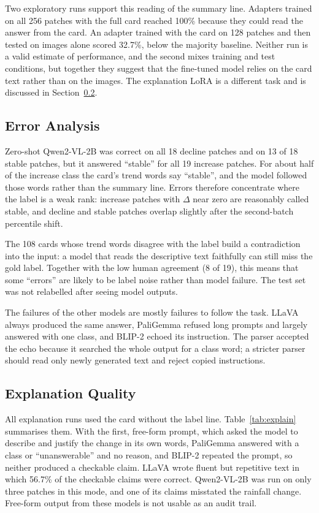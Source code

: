 Two exploratory runs support this reading of the summary line. Adapters
trained on all 256 patches with the full card reached 100\% because
they could read the answer from the card. An adapter trained with the
card on 128 patches and then tested on images alone scored 32.7\%,
below the majority baseline. Neither run is a valid estimate of
performance, and the second mixes training and test conditions, but
together they suggest that the fine-tuned model relies on the card text
rather than on the images. The explanation LoRA is a
different task and is discussed in Section~\ref{sec:expl}.

\subsection{Error Analysis}

Zero-shot Qwen2-VL-2B was correct on all 18 decline patches and on 13 of
18 stable patches, but it answered ``stable'' for all 19 increase
patches. For about half of the increase class the card's trend words
say ``stable'', and the model followed those words rather than the
summary line. Errors therefore concentrate where the label is a weak
rank: increase patches with $\Delta$ near zero are reasonably called
stable, and decline and stable patches overlap slightly after the
second-batch percentile shift.

The 108 cards whose trend words disagree with the label build a
contradiction into the input: a model that reads the descriptive text
faithfully can still miss the gold label. Together with the low human
agreement (8 of 19), this means that some ``errors'' are likely to be
label noise rather than model failure. The test set was not relabelled
after seeing model outputs.

The failures of the other models are mostly failures to follow the task.
LLaVA always produced the same answer, PaliGemma refused long prompts
and largely answered with one class, and BLIP-2 echoed its instruction.
The parser accepted the echo because it searched the whole output for a
class word; a stricter parser should read only newly generated text and
reject copied instructions.

\subsection{Explanation Quality}
\label{sec:expl}

All explanation runs used the card without the label line.
Table~\ref{tab:explain} summarises them. With the first, free-form
prompt, which asked the model to describe and justify the change in its
own words, PaliGemma answered with a class or ``unanswerable'' and no
reason, and BLIP-2 repeated the prompt, so neither produced a checkable
claim. LLaVA wrote fluent but repetitive text in which 56.7\% of the
checkable claims were correct. Qwen2-VL-2B was run on only three
patches in this mode, and one of its claims misstated the rainfall
change. Free-form output from these models is not usable as an audit
trail.

